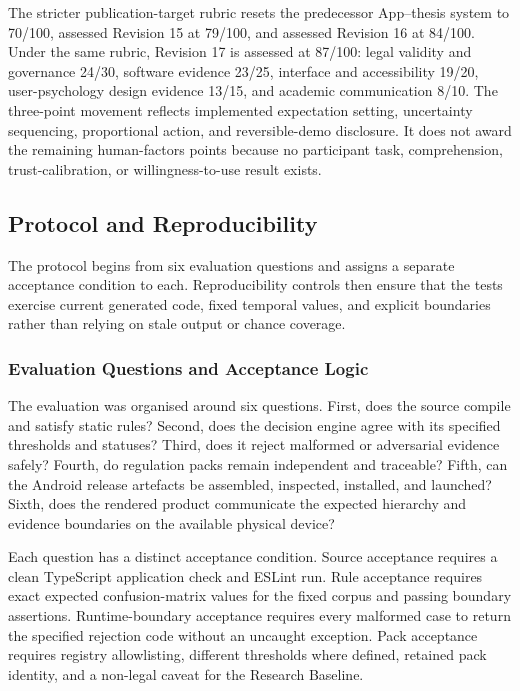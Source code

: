 The stricter publication-target rubric resets the predecessor App--thesis system to 70/100, assessed Revision 15 at 79/100, and assessed Revision 16 at 84/100. Under the same rubric, Revision 17 is assessed at 87/100: legal validity and governance 24/30, software evidence 23/25, interface and accessibility 19/20, user-psychology design evidence 13/15, and academic communication 8/10. The three-point movement reflects implemented expectation setting, uncertainty sequencing, proportional action, and reversible-demo disclosure. It does not award the remaining human-factors points because no participant task, comprehension, trust-calibration, or willingness-to-use result exists.

\subsection{Protocol and Reproducibility}

The protocol begins from six evaluation questions and assigns a separate acceptance condition to each. Reproducibility controls then ensure that the tests exercise current generated code, fixed temporal values, and explicit boundaries rather than relying on stale output or chance coverage.

\subsubsection{Evaluation Questions and Acceptance Logic}

The evaluation was organised around six questions. First, does the source compile and satisfy static rules? Second, does the decision engine agree with its specified thresholds and statuses? Third, does it reject malformed or adversarial evidence safely? Fourth, do regulation packs remain independent and traceable? Fifth, can the Android release artefacts be assembled, inspected, installed, and launched? Sixth, does the rendered product communicate the expected hierarchy and evidence boundaries on the available physical device?

Each question has a distinct acceptance condition. Source acceptance requires a clean TypeScript application check and ESLint run. Rule acceptance requires exact expected confusion-matrix values for the fixed corpus and passing boundary assertions. Runtime-boundary acceptance requires every malformed case to return the specified rejection code without an uncaught exception. Pack acceptance requires registry allowlisting, different thresholds where defined, retained pack identity, and a non-legal caveat for the Research Baseline.


